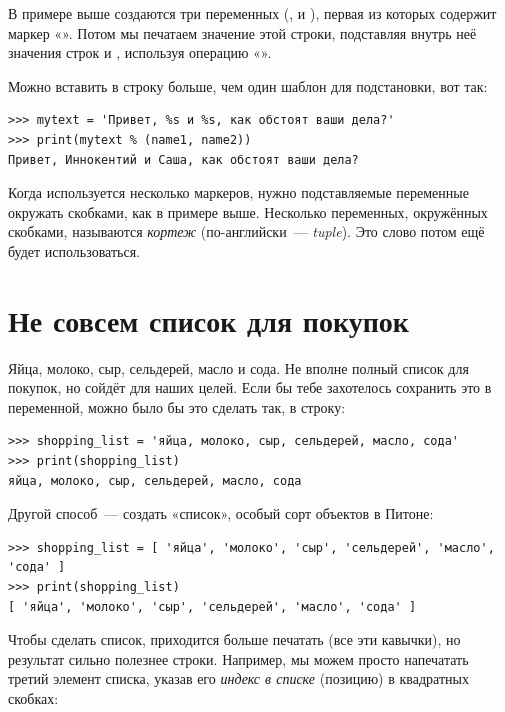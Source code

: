 В примере выше создаются три переменных (,  и ), первая из которых содержит маркер «». Потом мы печатаем значение этой строки, подставляя внутрь неё значения строк  и , используя операцию «\code{\%}».

Можно вставить в строку больше, чем один шаблон для подстановки, вот так:

\begin{listing}
\begin{verbatim}
>>> mytext = 'Привет, %s и %s, как обстоят ваши дела?'
>>> print(mytext % (name1, name2))
Привет, Иннокентий и Саша, как обстоят ваши дела?
\end{verbatim}
\end{listing}

Когда используется несколько маркеров, нужно подставляемые переменные окружать скобками, как в примере выше. Несколько переменных, окружённых скобками, называются \emph{кортеж} (по-английски — \emph{tuple}). Это слово потом ещё будет использоваться.

\section{Не совсем список для покупок}

Яйца, молоко, сыр, сельдерей, масло и сода. Не вполне полный список для покупок, но сойдёт для наших целей. Если бы тебе захотелось сохранить это в переменной, можно было бы это сделать так, в строку:

\begin{listing}
\begin{verbatim}
>>> shopping_list = 'яйца, молоко, сыр, сельдерей, масло, сода'
>>> print(shopping_list)
яйца, молоко, сыр, сельдерей, масло, сода
\end{verbatim}
\end{listing}

Другой способ — создать «список», особый сорт объектов в Питоне:

\begin{listing}
\begin{verbatim}
>>> shopping_list = [ 'яйца', 'молоко', 'сыр', 'сельдерей', 'масло', 'сода' ]
>>> print(shopping_list)
[ 'яйца', 'молоко', 'сыр', 'сельдерей', 'масло', 'сода' ]
\end{verbatim}
\end{listing}

Чтобы сделать список, приходится больше печатать (все эти кавычки), но результат сильно полезнее строки. Например, мы можем просто напечатать третий элемент списка, указав его \emph{индекс в списке} (позицию) в квадратных скобках:

